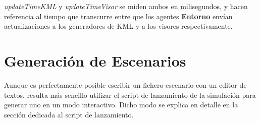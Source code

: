 {\em updateTimeKML} y {\em updateTimeVisor} se miden ambos en milisegundos, y
hacen referencia al tiempo que transcurre entre que los agentes {\bf Entorno}
envían actualizaciones a los generadores de KML y a los visores respectivamente.

\section{Generación de Escenarios}

Aunque es perfectamente posible escribir un fichero escenario con un editor de
textos, resulta más sencillo utilizar el script de lanzamiento de la simulación
para generar uno en un modo interactivo. Dicho modo se explica en detalle en la
sección dedicada al script de lanzamiento.

